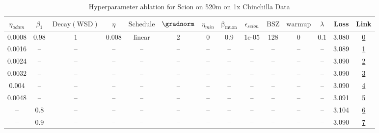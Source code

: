 \begin{table}[H]
\centering
\caption{Hyperparameter ablation for Scion on 520m on 1x Chinchilla Data}
\label{tab:ablation_scion_520m_on_1x_chinchilla_data}
\begin{tabular}{cccccccccccccc}
\toprule
$\eta_{adam}$ & $\beta_1$ & $\mathrm{Decay (WSD)}$ & $\eta$ & $\mathrm{Schedule}$ & $\gradnorm$ & $\eta_{min}$ & $\mathrm{\beta_{muon}}$ & $\epsilon_{scion}$ & $\mathrm{BSZ}$ & $\mathrm{warmup}$ & $\lambda$ & Loss & Link \\
\midrule
0.0008 & 0.98 & 1 & 0.008 & linear & 2 & 0 & 0.9 & 1e-05 & 128 & 0 & 0.1 & 3.080 & \href{https://wandb.ai/stanford-mercury/optimizer-scaling/runs/sweep-520m-10B-scioncff10blr0.008-wd0.1-minlr0-warmup0-b10.98-gn-c03799}{0} \\
\midrule
0.0016 & -- & -- & -- & -- & -- & -- & -- & -- & -- & -- & -- & 3.089 & \href{https://wandb.ai/stanford-mercury/optimizer-scaling/runs/sweep-520m-10B-sciona0c000lr0.008-wd0.1-minlr0-warmup0-b10.98-gn-d5b09d}{1} \\
0.0024 & -- & -- & -- & -- & -- & -- & -- & -- & -- & -- & -- & 3.090 & \href{https://wandb.ai/stanford-mercury/optimizer-scaling/runs/sweep-520m-10B-sciondcb087lr0.008-wd0.1-minlr0-warmup0-b10.98-gn-292cdc}{2} \\
0.0032 & -- & -- & -- & -- & -- & -- & -- & -- & -- & -- & -- & 3.090 & \href{https://wandb.ai/stanford-mercury/optimizer-scaling/runs/sweep-520m-10B-scion52ef41lr0.008-wd0.1-minlr0-warmup0-b10.98-gn-3e355e}{3} \\
0.004 & -- & -- & -- & -- & -- & -- & -- & -- & -- & -- & -- & 3.090 & \href{https://wandb.ai/stanford-mercury/optimizer-scaling/runs/sweep-520m-10B-scion42bbdflr0.008-wd0.1-minlr0-warmup0-b10.98-gn-a79196}{4} \\
0.0048 & -- & -- & -- & -- & -- & -- & -- & -- & -- & -- & -- & 3.091 & \href{https://wandb.ai/stanford-mercury/optimizer-scaling/runs/sweep-520m-10B-scion1a0f9alr0.008-wd0.1-minlr0-warmup0-b10.98-gn-6eb8c4}{5} \\
-- & 0.8 & -- & -- & -- & -- & -- & -- & -- & -- & -- & -- & 3.104 & \href{https://wandb.ai/stanford-mercury/optimizer-scaling/runs/sweep-520m-10B-scion6a83d1lr0.008-wd0.1-minlr0-warmup0-b10.8-gn2-b778f8}{6} \\
-- & 0.9 & -- & -- & -- & -- & -- & -- & -- & -- & -- & -- & 3.090 & \href{https://wandb.ai/stanford-mercury/optimizer-scaling/runs/sweep-520m-10B-scion8775a0lr0.008-wd0.1-minlr0-warmup0-b10.9-gn2-425030}{7} \\

\end{tabular}
\end{table}
